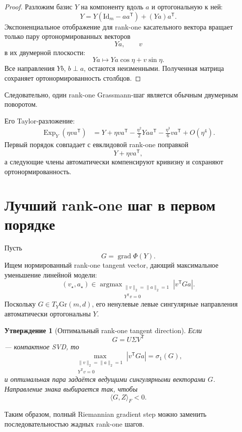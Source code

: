 \documentclass[11pt,a4paper]{article}
\newcommand{\T}{^{\mathsf T}}
\newcommand{\Id}{\mathrm{Id}}
\newcommand{\Gr}{\mathrm{Gr}}
\newcommand{\Exp}{\operatorname{Exp}}
\newcommand{\grad}{\operatorname{grad}}
\DeclareMathOperator{\argmax}{argmax}
\newtheorem{proposition}{Утверждение}
\begin{document}
\begin{proof}
Разложим базис \(Y\) на компоненту вдоль \(a\) и ортогональную к ней:
\[
    Y
    =
    Y(\Id_m-aa\T)
    +
    (Ya)a\T.
\]
Экспоненциальное отображение для rank-one касательного вектора
вращает только пару ортонормированных векторов
\[
    Ya,\qquad v
\]
в их двумерной плоскости:
\[
    Ya
    \mapsto
    Ya\cos\eta+v\sin\eta.
\]
Все направления \(Yb\), \(b\perp a\), остаются неизменными.
Полученная матрица сохраняет ортонормированность столбцов.
\end{proof}

Следовательно, один rank-one Grassmann-шаг является обычным
двумерным поворотом.

Его Taylor-разложение:
\[
\begin{aligned}
    \Exp_Y(\eta va\T)
    &=
    Y
    +
    \eta va\T
    -
    \frac{\eta^2}{2}Yaa\T
    -
    \frac{\eta^3}{6}va\T
    +
    O(\eta^4).
\end{aligned}
\]
Первый порядок совпадает с евклидовой rank-one поправкой
\[
    Y+\eta va\T,
\]
а следующие члены автоматически компенсируют кривизну и сохраняют
ортонормированность.

\section{Лучший rank-one шаг в первом порядке}

Пусть
\[
    G=\grad\Phi(Y).
\]
Ищем нормированный rank-one tangent vector, дающий максимальное
уменьшение линейной модели:
\[
    (v_\star,a_\star)
    \in
    \argmax_{\substack{
        \|v\|_2=\|a\|_2=1\\
        Y\T v=0
    }}
    \left|
        v\T G a
    \right|.
\]
Поскольку \(G\in T_Y\Gr(m,d)\), его ненулевые левые сингулярные
направления автоматически ортогональны \(Y\).

\begin{proposition}[Оптимальный rank-one tangent direction]
Если
\[
    G
    =
    U\Sigma V\T
\]
--- компактное SVD, то
\[
    \max_{\substack{
        \|v\|_2=\|a\|_2=1\\
        Y\T v=0
    }}
    |v\T Ga|
    =
    \sigma_1(G),
\]
и оптимальная пара задаётся ведущими сингулярными векторами \(G\).
Направление знака выбирается так, чтобы
\[
    \langle G,Z\rangle_F<0.
\]
\end{proposition}

Таким образом, полный Riemannian gradient step можно заменить
последовательностью жадных rank-one шагов.
\end{document}

